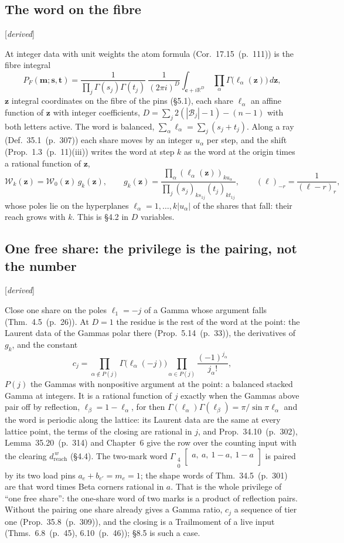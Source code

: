 \documentclass[11pt]{article}
\newcommand{\cB}{\mathcal B}
\newcommand{\mvec}{\mathbf m}
\newcommand{\Gst}[4]{\Gamma_{\substack{#1\\#2}}\!\begin{bmatrix}#3\\#4\end{bmatrix}}
\newcommand{\status}[1]{\hfill{\small[\textit{#1}]}}
\newcommand{\hb}[2]{#1~(p.~#2)}   %
\theoremstyle{plain}
\theoremstyle{remark}
\begin{document}
\subsection{The word on the fibre}\status{derived}

At integer data with unit weights the atom formula (Cor.~\hb{17.15}{111}) is the fibre integral
\[
P_F(\mvec;\mathbf s,\mathbf t)=\frac1{\prod_j\Gamma(s_j)\Gamma(t_j)}\ \frac1{(2\pi i)^D}\int_{\mathbf c+i\mathbb R^D}\ \prod_{\alpha}\Gamma\big(\ell_\alpha(\mathbf z)\big)\,d\mathbf z,
\]
$\mathbf z$ integral coordinates on the fibre of the pins (\S5.1), each share $\ell_\alpha$ an affine function of $\mathbf z$ with integer coefficients, $D=\sum_j2(|\cB_j|-1)-(n-1)$ with both letters active. The word is balanced, $\sum_\alpha\ell_\alpha=\sum_j(s_j+t_j)$. Along a ray (Def.~\hb{35.1}{307}) each share moves by an integer $u_\alpha$ per step, and the shift (Prop.~\hb{1.3}{11}(iii)) writes the word at step $k$ as the word at the origin times a rational function of $\mathbf z$,
\[
\mathcal W_k(\mathbf z)=\mathcal W_0(\mathbf z)\,g_k(\mathbf z),\qquad g_k(\mathbf z)=\frac{\prod_\alpha(\ell_\alpha(\mathbf z))_{ku_\alpha}}{\prod_j(s_j)_{ks_{1j}}(t_j)_{kt_{1j}}},\qquad(\ell)_{-r}=\frac1{(\ell-r)_r},
\]
whose poles lie on the hyperplanes $\ell_\alpha=1,\dots,k|u_\alpha|$ of the shares that fall: their reach grows with $k$. This is \S4.2 in $D$ variables.

\subsection{One free share: the privilege is the pairing, not the number}\status{derived}

Close one share on the poles $\ell_1=-j$ of a Gamma whose argument falls (Thm.~\hb{4.5}{26}). At $D=1$ the residue is the rest of the word at the point: the Laurent data of the Gammas polar there (Prop.~\hb{5.14}{33}), the derivatives of $g_k$, and the constant
\[
c_j=\prod_{\alpha\notin P(j)}\Gamma\big(\ell_\alpha(-j)\big)\prod_{\alpha\in P(j)}\frac{(-1)^{j_\alpha}}{j_\alpha!},
\]
$P(j)$ the Gammas with nonpositive argument at the point: a balanced stacked Gamma at integers. It is a rational function of $j$ exactly when the Gammas above pair off by reflection, $\ell_\beta=1-\ell_\alpha$, for then $\Gamma(\ell_\alpha)\Gamma(\ell_\beta)=\pi/\sin\pi\ell_\alpha$ and the word is periodic along the lattice: its Laurent data are the same at every lattice point, the terms of the closing are rational in $j$, and Prop.~\hb{34.10}{302}, Lemma~\hb{35.20}{314} and Chapter~6 give the row over the counting input with the clearing $d^{\,w}_{\mathrm{reach}}$ (\S4.4). The two-mark word $\Gst40{a,\ a,\ 1-a,\ 1-a}{}$ is paired by its two load pins $a_e+b_{e'}=m_e=1$; the shape words of Thm.~\hb{34.5}{301} are that word times Beta corners rational in $a$. That is the whole privilege of ``one free share'': the one-share word of two marks is a product of reflection pairs. Without the pairing one share already gives a Gamma ratio, $c_j$ a sequence of tier one (Prop.~\hb{35.8}{309}), and the closing is a Trailmoment of a live input (Thms.~\hb{6.8}{45}, \hb{6.10}{46}); \S8.5 is such a case.
\end{document}
